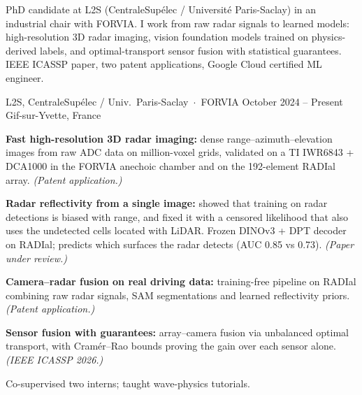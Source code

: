 




\noindent
PhD candidate at L2S (CentraleSupélec / Université Paris-Saclay) in an industrial chair with
FORVIA. I work from raw radar signals to learned models: high-resolution 3D radar imaging,
vision foundation models trained on physics-derived labels, and optimal-transport sensor fusion
with statistical guarantees. IEEE ICASSP paper, two patent applications, Google Cloud certified
ML engineer.
\vspace{1pt}


%
        {L2S, CentraleSupélec / Univ.\ Paris-Saclay \,$\cdot$\, FORVIA}%
        {October 2024 -- Present}%
        {Gif-sur-Yvette, France}
\begin{cvitems}
  \item \textbf{Fast high-resolution 3D radar imaging:} dense range--azimuth--elevation images from raw
        ADC data on million-voxel grids, validated on a TI IWR6843 + DCA1000 in the FORVIA anechoic
        chamber and on the 192-element RADIal array. \emph{(Patent application.)}
  \item \textbf{Radar reflectivity from a single image:} showed that training on radar detections is
        biased with range, and fixed it with a censored likelihood that also uses the undetected cells
        located with LiDAR. Frozen DINOv3 + DPT decoder on RADIal; predicts which surfaces the radar
        detects (AUC 0.85 vs 0.73). \emph{(Paper under review.)}
  \item \textbf{Camera--radar fusion on real driving data:} training-free pipeline on RADIal combining
        raw radar signals, SAM segmentations and learned reflectivity priors. \emph{(Patent application.)}
  \item \textbf{Sensor fusion with guarantees:} array--camera fusion via unbalanced optimal transport,
        with Cramér--Rao bounds proving the gain over each sensor alone. \emph{(IEEE ICASSP 2026.)}
  \item Co-supervised two interns; taught wave-physics tutorials.
\end{cvitems}


